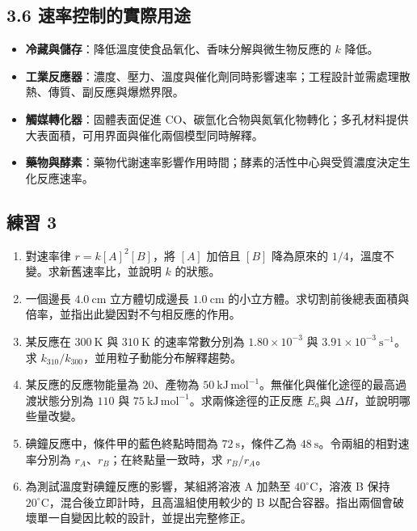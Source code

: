 \documentclass[11pt,a4paper]{article}
\providecommand{\tightlist}{%
  \setlength{\itemsep}{0pt}\setlength{\parskip}{0pt}}
\begin{document}
\subsection{3.6 速率控制的實際用途}\label{ux901fux7387ux63a7ux5236ux7684ux5be6ux969bux7528ux9014}

\begin{itemize}
\tightlist
\item
  \textbf{冷藏與儲存}：降低溫度使食品氧化、香味分解與微生物反應的 \(k\) 降低。
\item
  \textbf{工業反應器}：濃度、壓力、溫度與催化劑同時影響速率；工程設計並需處理散熱、傳質、副反應與爆燃界限。
\item
  \textbf{觸媒轉化器}：固體表面促進 CO、碳氫化合物與氮氧化物轉化；多孔材料提供大表面積，可用界面與催化兩個模型同時解釋。
\item
  \textbf{藥物與酵素}：藥物代謝速率影響作用時間；酵素的活性中心與受質濃度決定生化反應速率。
\end{itemize}

\subsection{練習 3}\label{ux7df4ux7fd2-3}

\begin{enumerate}
\def\labelenumi{\arabic{enumi}.}
\tightlist
\item
  對速率律 \(r=k[A]^2[B]\)，將 \([A]\) 加倍且 \([B]\) 降為原來的 \(1/4\)，溫度不變。求新舊速率比，並說明 \(k\) 的狀態。
\item
  一個邊長 \(4.0\ \mathrm{cm}\) 立方體切成邊長 \(1.0\ \mathrm{cm}\) 的小立方體。求切割前後總表面積與倍率，並指出此變因對不勻相反應的作用。
\item
  某反應在 \(300\ \mathrm K\) 與 \(310\ \mathrm K\) 的速率常數分別為 \(1.80\times10^{-3}\) 與 \(3.91\times10^{-3}\ \mathrm{s^{-1}}\)。求 \(k_{310}/k_{300}\)，並用粒子動能分布解釋趨勢。
\item
  某反應的反應物能量為 \(20\)、產物為 \(50\ \mathrm{kJ\,mol^{-1}}\)。無催化與催化途徑的最高過渡狀態分別為 \(110\) 與 \(75\ \mathrm{kJ\,mol^{-1}}\)。求兩條途徑的正反應 \(E_a\)與 \(\Delta H\)，並說明哪些量改變。
\item
  碘鐘反應中，條件甲的藍色終點時間為 \(72\ \mathrm s\)，條件乙為 \(48\ \mathrm s\)。令兩組的相對速率分別為 \(r_A\)、\(r_B\)；在終點量一致時，求 \(r_B/r_A\)。
\item
  為測試溫度對碘鐘反應的影響，某組將溶液 A 加熱至 \(40^\circ\mathrm C\)，溶液 B 保持 \(20^\circ\mathrm C\)，混合後立即計時，且高溫組使用較少的 B 以配合容器。指出兩個會破壞單一自變因比較的設計，並提出完整修正。
\end{enumerate}
\end{document}
